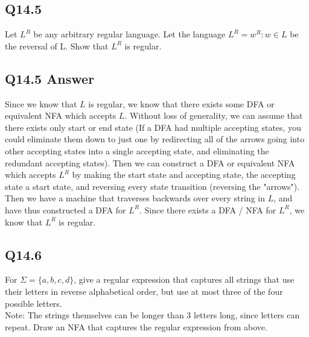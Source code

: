\documentclass{article}
\begin{document}
\subsection*{Q14.5}
Let $L^R$ be any arbitrary regular language. Let the language $L^R = {w^R : w \in L}$ be the reversal of L.
Show that $L^R$ is regular.
\newpage
\subsection*{Q14.5 Answer}
Since we know that $L$ is regular, we know that there exists some DFA or equivalent NFA which accepts $L$. Without loss of generality, we can
assume that there exists only start or end state (If a DFA had multiple accepting states, you could eliminate them down to just one 
by redirecting all of the arrows going into other accepting states into a single accepting state, and eliminating the redundant accepting
states). Then we can construct a DFA or equivalent NFA which accepts $L^R$ by making the start state and accepting state, the accepting state
a start state, and reversing every state transition (reversing the "arrows"). Then we have a machine that traverses backwards over every
string in $L$, and have thus constructed a DFA for $L^R$. Since there exists a DFA / NFA for $L^R$, we know that $L^R$ is regular.
\newpage

\subsection*{Q14.6}
For $\Sigma=\{a,b,c,d\}$, give a regular expression that captures all strings that use their letters in reverse alphabetical order, but use at most three of the four possible letters.
\\ Note: The strings themselves can be longer than 3 letters long, since letters can repeat.
 Draw an NFA that captures the regular expression from above.
\newpage
\end{document}
